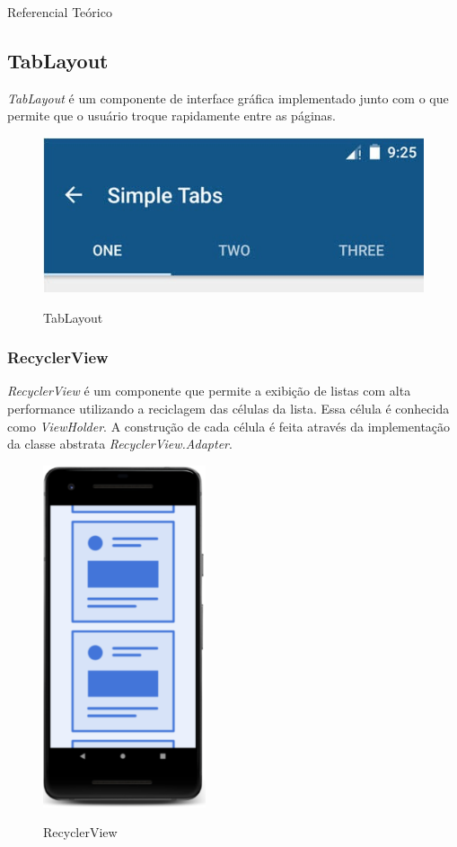 \documentclass[
	12pt,				%
	openany,			%
	twoside,			%
	a4paper,			%
	english,			%
	french,				%
	spanish,			%
	brazil				%
	]{abntex2}
\begin{document}
\begin{chapter}{Referencial Teórico}
\subsection{TabLayout} \label{TabLayout}
\textit{TabLayout} é um componente de interface gráfica  implementado junto com o  que permite que o usuário troque rapidamente entre as páginas.
\begin{figure}[h]
\centering
   \caption{TabLayout}
   \includegraphics[scale=0.5]{media/tabs.jpg}
     \label{fig:tabs}
\end{figure}

\subsubsection{RecyclerView} \label{RecyclerView}
\textit{RecyclerView} é um componente que permite a exibição de listas com alta performance utilizando a reciclagem das células da lista. Essa célula é conhecida como \textit{ViewHolder}. A construção de cada célula é feita através da implementação da classe abstrata \textit{RecyclerView.Adapter}.



\begin{figure}[h]
\centering
   \caption{RecyclerView}
   \includegraphics[scale=1.0]{media/recyclerview.png}
     \label{fig:recyclerview}
\end{figure}


\end{chapter}
\end{document}
